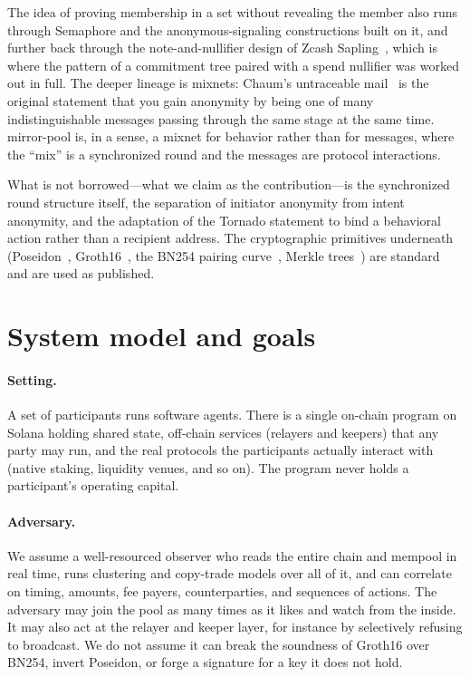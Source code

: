 \documentclass[11pt]{article}
\begin{document}
The idea of proving membership in a set without revealing the member also runs
through Semaphore and the anonymous-signaling constructions built on it, and
further back through the note-and-nullifier design of Zcash Sapling~\cite{zcash},
which is where the pattern of a commitment tree paired with a spend nullifier was
worked out in full. The deeper lineage is mixnets: Chaum's untraceable
mail~\cite{chaum} is the original statement that you gain anonymity by being one
of many indistinguishable messages passing through the same stage at the same
time. mirror-pool is, in a sense, a mixnet for behavior rather than for messages,
where the ``mix'' is a synchronized round and the messages are protocol
interactions.

What is not borrowed---what we claim as the contribution---is the synchronized
round structure itself, the separation of initiator anonymity from intent
anonymity, and the adaptation of the Tornado statement to bind a behavioral
action rather than a recipient address. The cryptographic primitives underneath
(Poseidon~\cite{poseidon}, Groth16~\cite{groth16}, the BN254 pairing
curve~\cite{bn254}, Merkle trees~\cite{merkle}) are standard and are used as
published.

\section{System model and goals}
\label{sec:model}

\paragraph{Setting.} A set of participants runs software agents. There is a single
on-chain program on Solana holding shared state, off-chain services (relayers and
keepers) that any party may run, and the real protocols the participants actually
interact with (native staking, liquidity venues, and so on). The program never
holds a participant's operating capital.

\paragraph{Adversary.} We assume a well-resourced observer who reads the entire
chain and mempool in real time, runs clustering and copy-trade models over all of
it, and can correlate on timing, amounts, fee payers, counterparties, and
sequences of actions. The adversary may join the pool as many times as it likes
and watch from the inside. It may also act at the relayer and keeper layer, for
instance by selectively refusing to broadcast. We do not assume it can break the
soundness of Groth16 over BN254, invert Poseidon, or forge a signature for a key
it does not hold.
\end{document}
